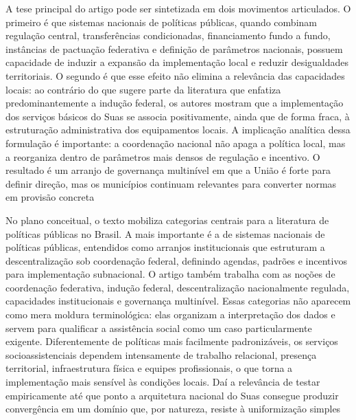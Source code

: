 \documentclass[12pt,a4paper]{article}
\begin{document}
A tese principal do artigo pode ser sintetizada em dois movimentos articulados. O primeiro é que sistemas nacionais de políticas públicas, quando combinam regulação central, transferências condicionadas, financiamento fundo a fundo, instâncias de pactuação federativa e definição de parâmetros nacionais, possuem capacidade de induzir a expansão da implementação local e reduzir desigualdades territoriais. O segundo é que esse efeito não elimina a relevância das capacidades locais: ao contrário do que sugere parte da literatura que enfatiza predominantemente a indução federal, os autores mostram que a implementação dos serviços básicos do Suas se associa positivamente, ainda que de forma fraca, à estruturação administrativa dos equipamentos locais. A implicação analítica dessa formulação é importante: a coordenação nacional não apaga a política local, mas a reorganiza dentro de parâmetros mais densos de regulação e incentivo. O resultado é um arranjo de governança multinível em que a União é forte para definir direção, mas os municípios continuam relevantes para converter normas em provisão concreta\parencite{bichir2020_sistemas_nacionais}

No plano conceitual, o texto mobiliza categorias centrais para a literatura de políticas públicas no Brasil. A mais importante é a de sistemas nacionais de políticas públicas, entendidos como arranjos institucionais que estruturam a descentralização sob coordenação federal, definindo agendas, padrões e incentivos para implementação subnacional. O artigo também trabalha com as noções de coordenação federativa, indução federal, descentralização nacionalmente regulada, capacidades institucionais e governança multinível. Essas categorias não aparecem como mera moldura terminológica: elas organizam a interpretação dos dados e servem para qualificar a assistência social como um caso particularmente exigente. Diferentemente de políticas mais facilmente padronizáveis, os serviços socioassistenciais dependem intensamente de trabalho relacional, presença territorial, infraestrutura física e equipes profissionais, o que torna a implementação mais sensível às condições locais. Daí a relevância de testar empiricamente até que ponto a arquitetura nacional do Suas consegue produzir convergência em um domínio que, por natureza, resiste à uniformização simples\parencite{bichir2020_sistemas_nacionais}
\end{document}
